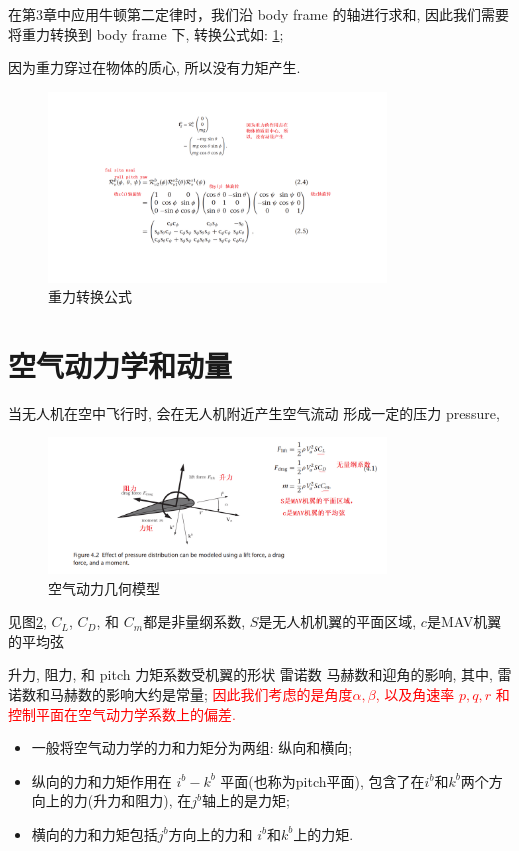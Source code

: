 \documentclass[UTF8,a4paper,10pt,nocolorlinks]{ctexart}
\begin{document}
    在第3章中应用牛顿第二定律时，我们沿 body frame 的轴进行求和, 因此我们需要将重力转换到 body frame 下, 转换公式如: \ref{fig:equ_1};

    因为重力穿过在物体的质心, 所以没有力矩产生. 
    \begin{figure}[htpb]
      \centering
      \includegraphics[width=0.8\textwidth]{picture/4_equ_1.png}
      \caption{重力转换公式}
      \label{fig:equ_1}
    \end{figure}

    \section{空气动力学和动量}
    当无人机在空中飞行时, 会在无人机附近产生空气流动 形成一定的压力 pressure, 

    \begin{figure}[htpb]
      \centering
      \includegraphics[width=0.8\textwidth]{picture/4_equ_2.png}
      \caption{空气动力几何模型}
      \label{fig:equ_2}
    \end{figure}

    见图\ref{fig:equ_2}, $C_{L}$, $C_{D}$, 和 $C_{m}$都是非量纲系数, $S$是无人机机翼的平面区域, $c$是MAV机翼的平均弦
    \par
    升力, 阻力, 和 pitch 力矩系数受机翼的形状 雷诺数 马赫数和迎角的影响, 其中, 雷诺数和马赫数的影响大约是常量; 
    \textcolor{red}{因此我们考虑的是角度$\alpha, \beta$, 以及角速率 $p, q, r$ 和 控制平面在空气动力学系数上的偏差.} \par
    \begin{itemize}
      \item 一般将空气动力学的力和力矩分为两组: 纵向和横向;
      \item 纵向的力和力矩作用在 $i^{b}-k^{b}$ 平面(也称为pitch平面), 包含了在$i^{b}$和$k^{b}$两个方向上的力(升力和阻力), 在$j^{b}$轴上的是力矩;
      \item 横向的力和力矩包括$j^{b}$方向上的力和 $i^{b}$和$k^b$上的力矩.
    \end{itemize}  
\end{document}
